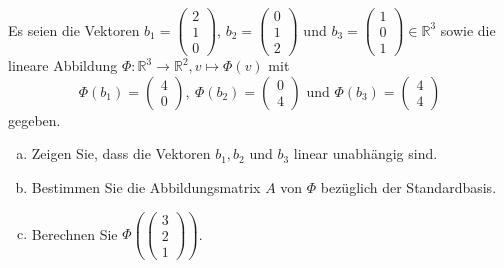 \documentclass[a4paper,11pt]{scrartcl}
\newcommand{\RR}{\mathbb{R}}
\begin{document}
Es seien die Vektoren $b_1=\begin{pmatrix} 2\\1\\0\end{pmatrix}$, $b_2=\begin{pmatrix} 0\\1\\2\end{pmatrix}$ und $b_3=\begin{pmatrix} 1\\0\\1\end{pmatrix} \in \RR^3$ sowie die lineare Abbildung 
$
\Phi: \RR^3 \to \RR^2, v \mapsto \Phi(v)
$
mit 
$$
\Phi(b_1)=\begin{pmatrix} 4\\0\end{pmatrix}, \ \Phi(b_2)=\begin{pmatrix} 0\\4\end{pmatrix} \text{ und } \Phi(b_3)=\begin{pmatrix} 4\\4\end{pmatrix}
$$
gegeben.

\begin{enumerate}[a)]

\item Zeigen Sie, dass die Vektoren $b_1,b_2$ und $b_3$ linear unabhängig sind.
\item Bestimmen Sie die Abbildungsmatrix $A$ von $\Phi$ bezüglich der Standardbasis.
\item Berechnen Sie $\Phi(\begin{pmatrix} 3\\2\\1 \end{pmatrix})$.

\end{enumerate}
\end{document}
